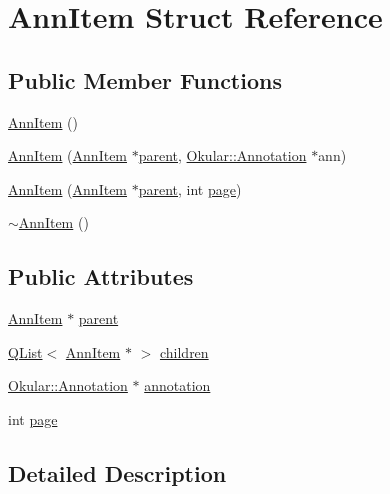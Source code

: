 \hypertarget{structAnnItem}{\section{Ann\+Item Struct Reference}
\label{structAnnItem}
}
\subsection*{Public Member Functions}
\begin{DoxyCompactItemize}
\item 
\hyperlink{structAnnItem_a470674064cc4782539c18b5a84d8d92c}{Ann\+Item} ()
\item 
\hyperlink{structAnnItem_a62238531831021d5e500ca21e4141f33}{Ann\+Item} (\hyperlink{structAnnItem}{Ann\+Item} $\ast$\hyperlink{structAnnItem_aece74b70cc6acc8ebb751256386f9be8}{parent}, \hyperlink{classOkular_1_1Annotation}{Okular\+::\+Annotation} $\ast$ann)
\item 
\hyperlink{structAnnItem_a347e18ec47f43003e855789dae47434c}{Ann\+Item} (\hyperlink{structAnnItem}{Ann\+Item} $\ast$\hyperlink{structAnnItem_aece74b70cc6acc8ebb751256386f9be8}{parent}, int \hyperlink{structAnnItem_ad2bc09dd1499fd52205eb02c3bf67830}{page})
\item 
\hyperlink{structAnnItem_a7ef99a3a1013d8a1daccc4c39d9f5369}{$\sim$\+Ann\+Item} ()
\end{DoxyCompactItemize}
\subsection*{Public Attributes}
\begin{DoxyCompactItemize}
\item 
\hyperlink{structAnnItem}{Ann\+Item} $\ast$ \hyperlink{structAnnItem_aece74b70cc6acc8ebb751256386f9be8}{parent}
\item 
\hyperlink{classQList}{Q\+List}$<$ \hyperlink{structAnnItem}{Ann\+Item} $\ast$ $>$ \hyperlink{structAnnItem_a11048051ad0be5a2c8607a9334e006a1}{children}
\item 
\hyperlink{classOkular_1_1Annotation}{Okular\+::\+Annotation} $\ast$ \hyperlink{structAnnItem_a72999b1a45d966e6f622dee4d958790f}{annotation}
\item 
int \hyperlink{structAnnItem_ad2bc09dd1499fd52205eb02c3bf67830}{page}
\end{DoxyCompactItemize}


\subsection{Detailed Description}


